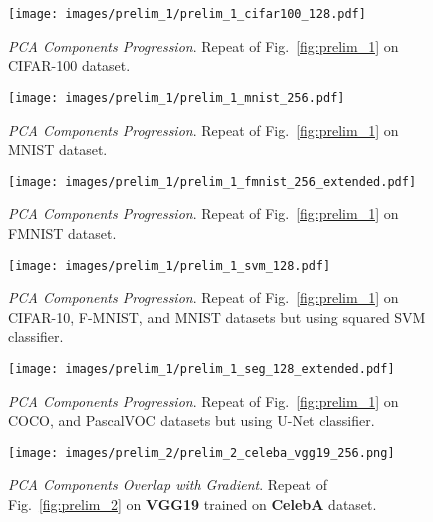 \begin{figure}[h!]
  \centering
  \centerline{\texttt{[image: images/prelim\_1/prelim\_1\_cifar100\_128.pdf]}}
  \caption{\small{\textit{PCA Components Progression}. Repeat of Fig.~\ref{fig:prelim_1} on CIFAR-100 dataset.}}
  \label{fig:prelim_1_cifar100}
\end{figure}

\begin{figure}[h!]
  \centering
  \centerline{\texttt{[image: images/prelim\_1/prelim\_1\_mnist\_256.pdf]}}
  \caption{\small{\textit{PCA Components Progression}. Repeat of Fig.~\ref{fig:prelim_1} on MNIST dataset.}}
  \label{fig:prelim_1_mnist}
\end{figure}

\begin{figure}[h!]
  \centering
  \centerline{\texttt{[image: images/prelim\_1/prelim\_1\_fmnist\_256\_extended.pdf]}}
  \caption{\small{\textit{PCA Components Progression}. Repeat of Fig.~\ref{fig:prelim_1} on FMNIST dataset.}}
  \label{fig:prelim_1_fmnist}
\end{figure}

\begin{figure}[h!]
  \centering
  \centerline{\texttt{[image: images/prelim\_1/prelim\_1\_svm\_128.pdf]}}
  \caption{\small{\textit{PCA Components Progression}. Repeat of Fig.~\ref{fig:prelim_1} on CIFAR-10, F-MNIST, and MNIST datasets but using squared SVM classifier.}}
  \label{fig:prelim_1_svm}
\end{figure}

\begin{figure}[h!]
  \centering
  \centerline{\texttt{[image: images/prelim\_1/prelim\_1\_seg\_128\_extended.pdf]}}
  \caption{\small{\textit{PCA Components Progression}. Repeat of Fig.~\ref{fig:prelim_1} on COCO, and PascalVOC datasets but using U-Net classifier.}}
  \label{fig:prelim_1_seg}
\end{figure}

\newpage

\begin{figure}[h!]
  \centering
  \centerline{\texttt{[image: images/prelim\_2/prelim\_2\_celeba\_vgg19\_256.png]}}
  \caption{\small{\textit{PCA Components Overlap with Gradient}. Repeat of Fig.~\ref{fig:prelim_2} on \textbf{VGG19} trained on \textbf{CelebA} dataset.}}
  \label{fig:prelim_2_celeba_vgg19}
\end{figure}

